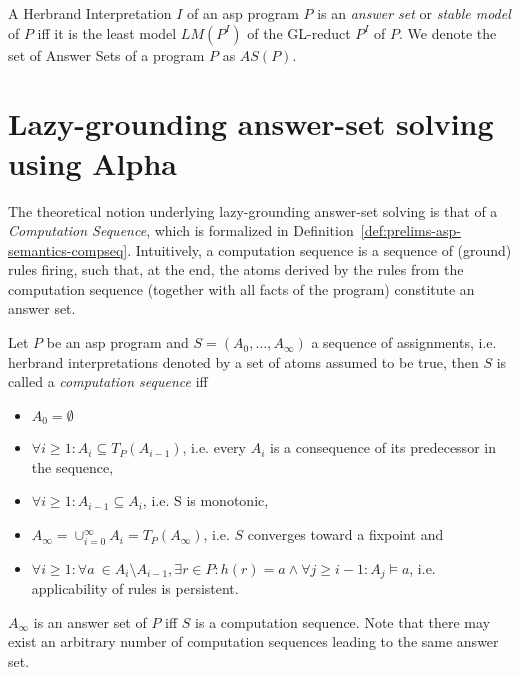 \begin{definition}
\label{def:prelims-asp-semantics-answer-set}
A Herbrand Interpretation $I$ of an \gls{asp} program $P$ is an \emph{answer set} or \emph{stable model} of $P$ iff it is the least model $LM(P^I)$ of the GL-reduct $P^I$ of $P$. We denote the set of Answer Sets of a program $P$ as $\mathit{AS}(P)$.
\end{definition}

\section{Lazy-grounding answer-set solving using Alpha}

The theoretical notion underlying lazy-grounding answer-set solving is that of a \emph{Computation Sequence}, which is formalized in Definition~\ref{def:prelims-asp-semantics-compseq}. Intuitively, a computation sequence is a sequence of (ground) rules firing, such that, at the end, the atoms derived by the rules from the computation sequence (together with all facts of the program) constitute an answer set.

\begin{definition}
\label{def:prelims-asp-semantics-compseq}
Let $P$ be an \gls{asp} program and $S = (A_0,\ldots,A_{\infty})$ a sequence of assignments, i.e. herbrand interpretations denoted by a set of atoms assumed to be true, then $S$ is called a \emph{computation sequence} iff
\begin{itemize}
	\item $A_0 = \emptyset$
	\item $\forall i \geq 1: A_i \subseteq T_P(A_{i - 1})$, i.e. every $A_i$ is a consequence of its predecessor in the sequence,
	\item $\forall i \geq 1: A_{i - 1} \subseteq A_{i}$, i.e. S is monotonic,
	\item $A_{\infty} = \cup^{\infty}_{i = 0} A_i = T_P(A_{\infty})$, i.e. $S$ converges toward a fixpoint and
	\item $\forall i \geq 1: \forall a \ \in A_i \setminus A_{i - 1}, \exists r \in P: h(r) = a \land \forall j \geq i - 1: A_j \models a$, i.e. applicability of rules is persistent.
\end{itemize}
$A_{\infty}$ is an answer set of $P$ iff $S$ is a computation sequence. Note that there may exist an arbitrary number of computation sequences leading to the same answer set.
\end{definition}

